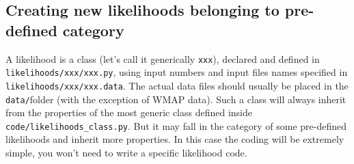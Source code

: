 \documentclass[10pt]{article}
\begin{document}
\subsection{Creating new likelihoods belonging to pre-defined category}

A likelihood is a class (let's call it generically \verb?xxx?), declared and defined in \verb?likelihoods/xxx/xxx.py?, using input numbers and input files names specified in \verb?likelihoods/xxx/xxx.data?. The actual data files should usually be placed in the \verb?data/?folder (with the exception of WMAP data). Such a class will always inherit from the properties of the most generic class defined inside \verb?code/likelihoods_class.py?. But it may fall in the category of some pre-defined likelihoods and inherit more properties. In this case the coding will be extremely simple, you won't need to write a specific likelihood code.
\end{document}
